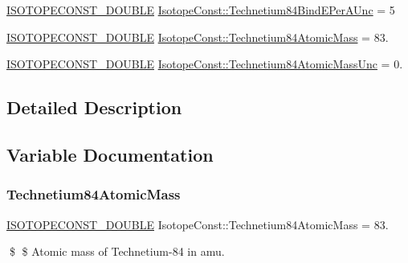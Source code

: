 \begin{DoxyCompactItemize}
\mbox{\hyperlink{group___isotope_const-_macros_ga8f45a7272ce02c0b4c65c44636ed719a}{I\+S\+O\+T\+O\+P\+E\+C\+O\+N\+S\+T\+\_\+\+D\+O\+U\+B\+LE}} \mbox{\hyperlink{group___isotope_const-_technetium-_tc84_gacdb432c5d93e8905fea8d334788959cf}{Isotope\+Const\+::\+Technetium84\+Bind\+E\+Per\+A\+Unc}} = 5
\item 
\mbox{\hyperlink{group___isotope_const-_macros_ga8f45a7272ce02c0b4c65c44636ed719a}{I\+S\+O\+T\+O\+P\+E\+C\+O\+N\+S\+T\+\_\+\+D\+O\+U\+B\+LE}} \mbox{\hyperlink{group___isotope_const-_technetium-_tc84_ga7501ac70b2271104ea1b965c5965a814}{Isotope\+Const\+::\+Technetium84\+Atomic\+Mass}} = 83.
\item 
\mbox{\hyperlink{group___isotope_const-_macros_ga8f45a7272ce02c0b4c65c44636ed719a}{I\+S\+O\+T\+O\+P\+E\+C\+O\+N\+S\+T\+\_\+\+D\+O\+U\+B\+LE}} \mbox{\hyperlink{group___isotope_const-_technetium-_tc84_ga90ebe33739a67fb866901e5de458dd81}{Isotope\+Const\+::\+Technetium84\+Atomic\+Mass\+Unc}} = 0.
\end{DoxyCompactItemize}


\subsection{Detailed Description}


\subsection{Variable Documentation}
\mbox{\label{group___isotope_const-_technetium-_tc84_ga7501ac70b2271104ea1b965c5965a814}} 
\subsubsection{\texorpdfstring{Technetium84\+Atomic\+Mass}{Technetium84AtomicMass}}
{\footnotesize\ttfamily \mbox{\hyperlink{group___isotope_const-_macros_ga8f45a7272ce02c0b4c65c44636ed719a}{I\+S\+O\+T\+O\+P\+E\+C\+O\+N\+S\+T\+\_\+\+D\+O\+U\+B\+LE}} Isotope\+Const\+::\+Technetium84\+Atomic\+Mass = 83.}

\$ \$ Atomic mass of Technetium-\/84 in amu. \mbox{\label{group___isotope_const-_technetium-_tc84_ga90ebe33739a67fb866901e5de458dd81}} 
